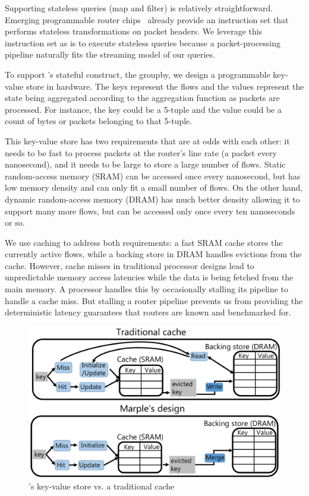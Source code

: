Supporting stateless queries ({\ct map} and {\ct filter}) is relatively
straightforward. Emerging programmable router chips~\cite{rmt, xpliant,
flexpipe, tofino} already provide an instruction set that performs stateless
transformations on packet headers. We leverage this instruction set as is to
execute stateless queries because a packet-processing pipeline naturally fits
the streaming model of our queries.

To support \TheSystem's stateful construct, the {\ct groupby}, we design a
programmable key-value store in hardware. The keys represent the flows and the
values represent the state being aggregated according to the aggregation
function as packets are processed. For instance, the key could be a 5-tuple and
the value could be a count of bytes or packets belonging to that 5-tuple.

This key-value store has two requirements that are at odds with each other: it
needs to be fast to process packets at the router's line rate (a packet every
nanosecond), and it needs to be large to store a large number of flows. Static
random-access memory (SRAM) can be accessed once every nanosecond, but has low
memory density and can only fit a small number of flows. On the other hand,
dynamic random-access memory (DRAM) has much better density allowing it to
support many more flows, but can be accessed only once every ten nanoseconds or
so.

We use caching to address both requirements: a fast SRAM cache stores the
currently active flows, while a backing store in DRAM handles evictions from
the cache. However, cache misses in traditional processor designs lead to
unpredictable memory access latencies while the data is being fetched from the
main memory. A processor handles this by occasionally stalling its pipeline to
handle a cache miss. But stalling a router pipeline prevents us from providing
the deterministic latency guarantees that routers are known and benchmarked
for.

\begin{figure}
\centering
\includegraphics[width=0.6\columnwidth]{pq_kv_store.pdf}
\caption{\TheSystem's key-value store vs. a traditional cache}
\label{fig:hw_diff}
\end{figure}

